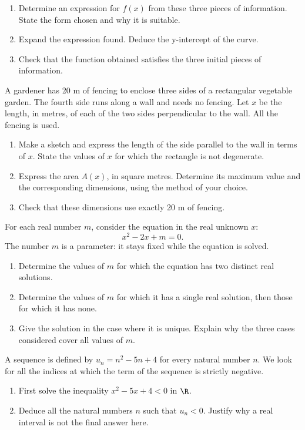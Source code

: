 \begin{enumerate}[label=\arabic*.]
\item Determine an expression for $f(x)$ from these three pieces of information. State the form chosen and why it is suitable.
\item Expand the expression found. Deduce the y-intercept of the curve.
\item Check that the function obtained satisfies the three initial pieces of information.
\end{enumerate}
A gardener has 20 m of fencing to enclose three sides of a rectangular vegetable garden. The fourth side runs along a wall and needs no fencing. Let $x$ be the length, in metres, of each of the two sides perpendicular to the wall. All the fencing is used.
\begin{enumerate}[label=\arabic*.]
\item Make a sketch and express the length of the side parallel to the wall in terms of $x$. State the values of $x$ for which the rectangle is not degenerate.
\item Express the area $A(x)$, in square metres. Determine its maximum value and the corresponding dimensions, using the method of your choice.
\item Check that these dimensions use exactly 20 m of fencing.
\end{enumerate}

For each real number $m$, consider the equation in the real unknown $x$:\[x^2-2x+m=0.\]The number $m$ is a parameter: it stays fixed while the equation is solved.
\begin{enumerate}[label=\arabic*.]
\item Determine the values of $m$ for which the equation has two distinct real solutions.
\item Determine the values of $m$ for which it has a single real solution, then those for which it has none.
\item Give the solution in the case where it is unique. Explain why the three cases considered cover all values of $m$.
\end{enumerate}
A sequence is defined by $u_n=n^2-5n+4$ for every natural number $n$. We look for all the indices at which the term of the sequence is strictly negative.
\begin{enumerate}[label=\arabic*.]
\item First solve the inequality $x^2-5x+4<0$ in $\R$.
\item Deduce all the natural numbers $n$ such that $u_n<0$. Justify why a real interval is not the final answer here.
\end{enumerate}
